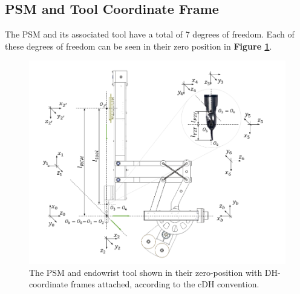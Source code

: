 \subsection{PSM and Tool Coordinate Frame}

The PSM and its associated tool have a total of 7 degrees of freedom. Each of these degrees of freedom can be seen in their zero position in \textbf{Figure \ref{fig:PSMCoord}}.

\begin{figure}[htb!]
    \centering
    \includegraphics[width=1.0\linewidth]{figures/PSMcoord.png}
    \caption{The PSM and endowrist tool shown in their zero-position with DH-coordinate frames attached, according to the cDH convention. \cite{walder2022design}}
    \label{fig:PSMCoord}
\end{figure}